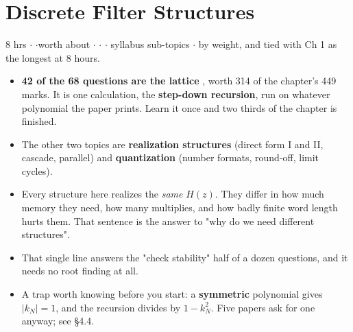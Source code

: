 \section{Discrete Filter Structures}

{\color{sub}\footnotesize 8 hrs \gap$\cdot$\gap {}
\gap$\cdot$\gap worth about  \gap$\cdot$\gap {} \gap$\cdot$\gap {} \gap$\cdot$ syllabus sub-topics
\gap$\cdot$\gap {} by weight, and tied with Ch 1 as the longest
at 8 hours.}

\begin{itemize}
  \item \textbf{42 of the 68 questions are the lattice} , worth 314 of the
        chapter's 449 marks. It is one calculation, the \textbf{step-down recursion},
        run on whatever polynomial the paper prints. Learn it once and two thirds of
        the chapter is finished.
  \item The other two topics are \textbf{realization structures}  (direct form I
        and II, cascade, parallel) and \textbf{quantization}  (number formats,
        round-off, limit cycles).
  \item {} Every structure here
        realizes the \emph{same} $H(z)$. They differ in how much memory they need, how
        many multiplies, and how badly finite word length hurts them. That sentence is
        the answer to "why do we need different structures".
  \item {} That single line
        answers the "check stability" half of a dozen questions, and it needs no
        root finding at all.
  \item A trap worth knowing before you start: a \textbf{symmetric} polynomial gives
        $|k_N|=1$, and the recursion divides by $1-k_N^2$.  Five papers ask for one anyway; see \S4.4.
\end{itemize}

